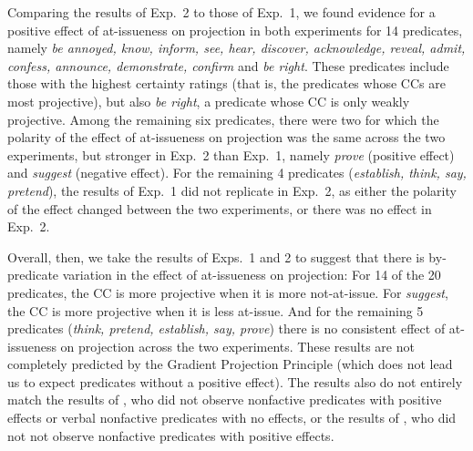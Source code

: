 \documentclass[11pt,fleqn]{article}
\newcommand{\6}{\mbox{$[\hspace*{-.6mm}[$}}
\newcommand{\9}{\mbox{$]\hspace*{-.6mm}]$}}
\begin{document}
Comparing the results of Exp.~2 to those of Exp.~1, we found evidence for a positive effect of at-issueness on projection in both experiments for 14 predicates, namely {\em be annoyed, know, inform, see, hear, discover, acknowledge, reveal, admit, confess, announce, demonstrate, confirm} and {\em be right}. These predicates include those with the highest certainty ratings (that is, the predicates whose CCs are most projective), but also \emph{be right}, a predicate whose CC is only weakly projective. Among the remaining six predicates, there were two for which the polarity of the effect of at-issueness on projection was the same across the two experiments, but stronger in Exp.~2 than Exp.~1, namely {\em prove} (positive effect) and {\em suggest} (negative effect). For the remaining 4 predicates ({\em establish, think, say, pretend}), the results of Exp.~1 did not replicate in Exp.~2, as either the polarity of the effect changed between the two experiments, or there was no effect in Exp.~2. 

Overall, then, we take the results of Exps.~1 and 2 to suggest that there is by-predicate variation in the effect of at-issueness on projection: For 14 of the 20 predicates, the CC is more projective when it is more not-at-issue. For {\em suggest}, the CC is more projective when it is less at-issue. And for the remaining 5 predicates (\emph{think, pretend, establish, say, prove}) there is no consistent effect of at-issueness on projection across the two experiments. These results  are not completely predicted by the Gradient Projection Principle (which does not lead us to expect predicates without a positive effect). The results also do not entirely match the results of \cite{djaerv-bacovcin-salt27,djaerv-bacovcin2020}, who did not observe nonfactive predicates with positive effects or verbal nonfactive predicates with no effects, or the results of \cite{mahler-etal2020}, who did not not observe nonfactive predicates with positive effects.
\end{document}
